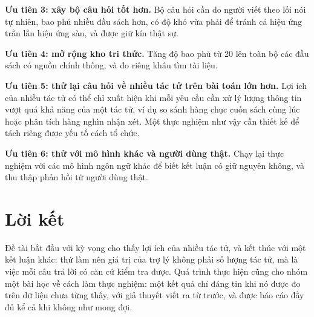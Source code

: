 \textbf{Ưu tiên 3: xây bộ câu hỏi tốt hơn.} Bộ câu hỏi cần do người viết theo lối nói tự nhiên, bao phủ nhiều đầu sách hơn, có độ khó vừa phải để tránh cả hiệu ứng trần lẫn hiệu ứng sàn, và được giữ kín thật sự.

\textbf{Ưu tiên 4: mở rộng kho tri thức.} Tăng độ bao phủ từ 20 lên toàn bộ các đầu sách có nguồn chính thống, và đo riêng khâu tìm tài liệu.

\textbf{Ưu tiên 5: thử lại câu hỏi về nhiều tác tử trên bài toán lớn hơn.} Lợi ích của nhiều tác tử có thể chỉ xuất hiện khi mỗi yêu cầu cần xử lý lượng thông tin vượt quá khả năng của một tác tử, ví dụ so sánh hàng chục cuốn sách cùng lúc hoặc phân tích hàng nghìn nhận xét. Một thực nghiệm như vậy cần thiết kế để tách riêng được yếu tố cách tổ chức.

\textbf{Ưu tiên 6: thử với mô hình khác và người dùng thật.} Chạy lại thực nghiệm với các mô hình ngôn ngữ khác để biết kết luận có giữ nguyên không, và thu thập phản hồi từ người dùng thật.

\section{Lời kết}

Đề tài bắt đầu với kỳ vọng cho thấy lợi ích của nhiều tác tử, và kết thúc với một kết luận khác: thứ làm nên giá trị của trợ lý không phải số lượng tác tử, mà là việc mỗi câu trả lời có căn cứ kiểm tra được. Quá trình thực hiện cũng cho nhóm một bài học về cách làm thực nghiệm: một kết quả chỉ đáng tin khi nó được đo trên dữ liệu chưa từng thấy, với giả thuyết viết ra từ trước, và được báo cáo đầy đủ kể cả khi không như mong đợi.
